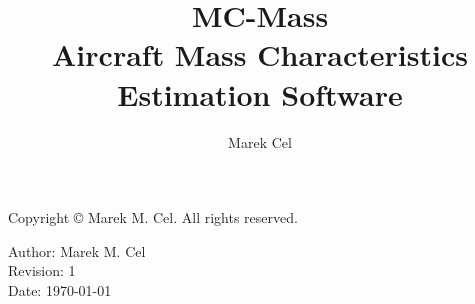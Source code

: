\documentclass[12pt,a4paper]{report}
\title{MC-Mass \\
\large Aircraft Mass Characteristics Estimation Software}
\author{Marek Cel}
\date{}
\begin{document}
  
  \maketitle

  \noindent Copyright \copyright{} \the\year{} Marek M. Cel. All rights reserved.

  \noindent Author: Marek M. Cel \\
  Revision: 1 \\
  Date: \today

  
  
  {
    \clearpage
    \setlength{\parskip}{0em}
    \tableofcontents
  }
  
  
  
  
  
  
  
  \clearpage
   
  
  
\end{document}
